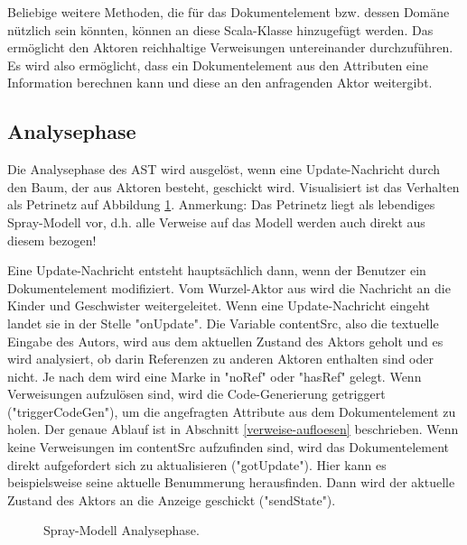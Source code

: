  
Beliebige weitere Methoden, die für das Dokumentelement bzw. dessen Domäne nützlich sein könnten, können an diese Scala-Klasse hinzugefügt werden. Das ermöglicht den Aktoren reichhaltige Verweisungen untereinander durchzuführen. Es wird also ermöglicht, dass ein Dokumentelement aus den Attributen eine Information berechnen kann und diese an den anfragenden Aktor weitergibt.

 
\subsection{Analysephase}\label{}
 
Die Analysephase des AST wird ausgelöst, wenn eine Update-Nachricht durch den Baum, der aus Aktoren besteht, geschickt wird. Visualisiert ist das Verhalten als Petrinetz auf Abbildung \ref{Analysephase}. Anmerkung: Das Petrinetz liegt als lebendiges Spray-Modell vor, d.h. alle Verweise auf das Modell werden auch direkt aus diesem bezogen!

 
Eine Update-Nachricht entsteht hauptsächlich dann, wenn der Benutzer ein Dokumentelement modifiziert. Vom Wurzel-Aktor aus wird die Nachricht an die Kinder und Geschwister weitergeleitet. Wenn eine Update-Nachricht eingeht landet sie in der Stelle "onUpdate". Die Variable contentSrc, also die textuelle Eingabe des Autors, wird aus dem aktuellen Zustand des Aktors geholt und es wird analysiert, ob darin Referenzen zu anderen Aktoren enthalten sind oder nicht. Je nach dem wird eine Marke in "noRef" oder "hasRef" gelegt. Wenn Verweisungen aufzulösen sind, wird die Code-Generierung getriggert ("triggerCodeGen"), um die angefragten Attribute aus dem Dokumentelement zu holen. Der genaue Ablauf ist in Abschnitt \ref{verweise-aufloesen} beschrieben. Wenn keine Verweisungen im contentSrc aufzufinden sind, wird das Dokumentelement direkt aufgefordert sich zu aktualisieren ("gotUpdate"). Hier kann es beispielsweise seine aktuelle Benummerung herausfinden. Dann wird der aktuelle Zustand des Aktors an die Anzeige geschickt ("sendState").

 
\begin{figure}[h!]
\centering
{}
\caption{ Spray-Modell Analysephase. }\label{Analysephase}
\end{figure}
 
